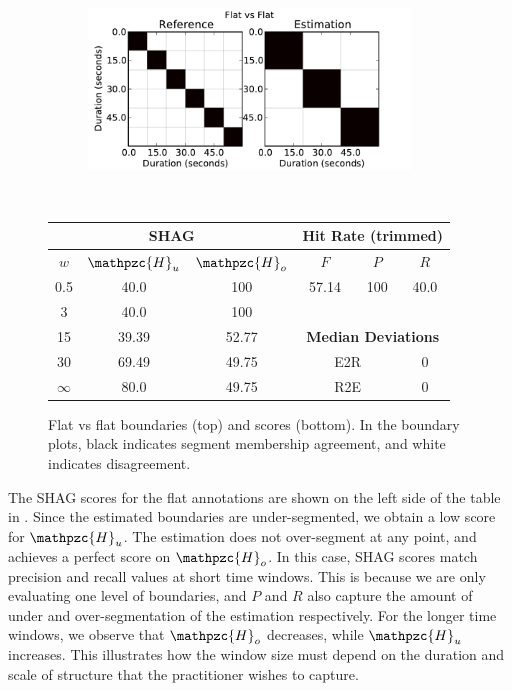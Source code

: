 \documentclass{article}
\def\shag{\ensuremath{\mathpzc{H}}}
\begin{document}
\begin{figure}
  \centering
  \begin{subfigure}{0.5\textwidth}
    \centering
    \includegraphics[width=0.94\textwidth]{plots/flat-flat.pdf}
  \end{subfigure}%
  \\
  \begin{minipage}{0.5\textwidth}
    \centering
    \vspace{10pt}
    \begin{tabular}{|c|c|c||c|c|c|}
      \hline
      \multicolumn{3}{|c||}{\textbf{SHAG}} & \multicolumn{3}{c|}{\textbf{Hit Rate (trimmed)}} \\
      \hline
      $w$ & $\shag_u$   & $\shag_o$ & $F$     & $P$     & $R$ \\
      \hline
      0.5       & 40.0   & 100   & 57.14  & 100 & 40.0 \\
      \cline{4-6}
      3         & 40.0   & 100  \\
      \cline{4-6}
      15        & 39.39  & 52.77 & \multicolumn{3}{c|}{\textbf{Median Deviations}}   \\
      \cline{4-6}
      30        & 69.49  & 49.75 & \multicolumn{2}{c|}{E2R} & 0 \\
      $\infty$  & 80.0   & 49.75 & \multicolumn{2}{c|}{R2E} & 0 \\  
      \hline
    \end{tabular}
  \end{minipage}
  \caption{Flat vs flat boundaries (top) and scores (bottom).  In the boundary plots, black indicates segment membership agreement, and white indicates disagreement.}
  \label{fig:flat-flat}
\end{figure}

The SHAG scores for the flat annotations are shown on the left side of the table in .
Since the estimated boundaries are under-segmented, we obtain a low score for $\shag_u$. The estimation does not over-segment at any point, and achieves a perfect score on $\shag_o$.
In this case, SHAG scores match precision and recall values at short time windows. This is because we are only evaluating one level of boundaries, and $P$ and $R$
also capture the amount of under and over-segmentation of the estimation respectively.
For the longer time windows, we observe that $\shag_o$ decreases, while $\shag_u$ 
increases.  This illustrates how the window size must depend on the duration and scale
of structure that the practitioner wishes to capture. 
\end{document}

